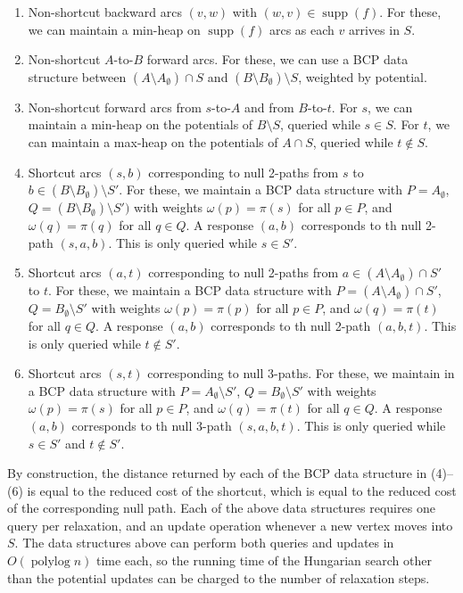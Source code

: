 \documentclass[a4paper,UKenglish]{socg-lipics-v2018}
\def\polylog{\mathop{\mathrm{polylog}}}
\def\supp{\operatorname{supp}}
\theoremstyle{plain}
\numberwithin{figure}{section}
\begin{document}
\begin{toappendix}

\begin{enumerate}
\item Non-shortcut backward arcs $(v, w)$ with $(w, v) \in \supp(f)$.
	For these, we can maintain a min-heap on $\supp(f)$ arcs as each $v$
	arrives in $S$.
\item Non-shortcut $A$-to-$B$ forward arcs.
	For these, we can use a BCP data structure between
	$(A \setminus A_\emptyset) \cap S$ and
	$(B \setminus B_\emptyset) \setminus S$, weighted by potential.
\item Non-shortcut forward arcs from $s$-to-$A$ and from $B$-to-$t$.
	For $s$, we can maintain a min-heap on the potentials of
	$B \setminus S$, queried while $s \in S$.
	For $t$, we can maintain a max-heap on the potentials of
	$A \cap S$, queried while $t \not\in S$.

\item Shortcut arcs $(s, b)$ corresponding to null 2-paths from $s$ to
	$b \in (B \setminus B_\emptyset) \setminus S'$.
	For these, we maintain a BCP data structure with $P = A_\emptyset$,
	$Q = (B \setminus B_\emptyset) \setminus S')$ with weights
	$\omega(p) = \pi(s)$ for all $p \in P$, and $\omega(q) = \pi(q)$ for
	all $q \in Q$.
	A response $(a, b)$ corresponds to th null 2-path $(s, a, b)$.
	This is only queried while $s \in S'$.
\item Shortcut arcs $(a, t)$ corresponding to null 2-paths from
	$a \in (A \setminus A_\emptyset) \cap S'$ to $t$.
	For these, we maintain a BCP data structure with
	$P = (A \setminus A_\emptyset) \cap S'$,
	$Q = B_\emptyset \setminus S'$ with weights $\omega(p) = \pi(p)$ for
	all $p \in P$, and $\omega(q) = \pi(t)$ for all $q \in Q$.
	A response $(a, b)$ corresponds to th null 2-path $(a, b, t)$.
	This is only queried while $t \not\in S'$.
\item Shortcut arcs $(s, t)$ corresponding to null 3-paths.
	For these, we maintain in a BCP data structure with
	$P = A_\emptyset \setminus S'$, $Q = B_\emptyset \setminus S'$ with
	weights $\omega(p) = \pi(s)$ for all
	$p \in P$, and $\omega(q) = \pi(t)$ for all $q \in Q$.
	A response $(a, b)$ corresponds to th null 3-path $(s, a, b, t)$.
	This is only queried while $s \in S'$ and $t \not\in S'$.
\end{enumerate}

\end{toappendix}

By construction, the distance returned by
each of the BCP data structure in (4)--(6) is equal to
the reduced cost of the shortcut, which is equal to the reduced cost of the
corresponding null path.
Each of the above data structures requires one query per relaxation, and an update operation whenever a new vertex moves into $S$.
The data structures above can perform both queries and updates in $O(\polylog n)$ time each, so the
running time of the Hungarian search other than the potential updates can be
charged to the number of relaxation steps.
\end{document}
